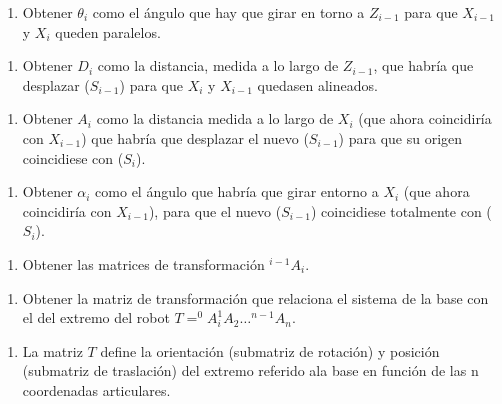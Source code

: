 \documentclass[twoside]{article}
\begin{document}
\begin{multicols}{2}
\begin{enumerate}
\def\labelenumi{\arabic{enumi}.}
\setcounter{enumi}{9}
\itemsep1pt\parskip0pt
\item
  Obtener $\theta_i$ como el ángulo que hay que girar en torno a $Z_{i-1}$ para que
  $X_{i-1}$ y $X_i$ queden paralelos.
\end{enumerate}

\begin{enumerate}
\def\labelenumi{\arabic{enumi}.}
\setcounter{enumi}{10}
\itemsep1pt\parskip0pt
\item
  Obtener $D_i$ como la distancia, medida a lo largo de $Z_{i-1}$, que habría
  que desplazar ($S_{i-1}$) para que $X_i$ y $X_{i-1}$ quedasen alineados.
\end{enumerate}

\begin{enumerate}
\def\labelenumi{\arabic{enumi}.}
\setcounter{enumi}{11}
\itemsep1pt\parskip0pt
\item
  Obtener $A_i$ como la distancia medida a lo largo de $X_i$ (que ahora
  coincidiría con $X_{i-1}$) que habría que desplazar el nuevo ($S_{i-1}$) para
  que su origen coincidiese con ($S_i$).
\end{enumerate}

\begin{enumerate}
\def\labelenumi{\arabic{enumi}.}
\setcounter{enumi}{12}
\itemsep1pt\parskip0pt
\item
  Obtener $\alpha_i$ como el ángulo que habría que girar entorno a $X_i$ (que ahora
  coincidiría con $X_{i-1}$), para que el nuevo ($S_{i-1}$) coincidiese totalmente
  con ($S_i$).
\end{enumerate}

\begin{enumerate}
\def\labelenumi{\arabic{enumi}.}
\setcounter{enumi}{13}
\itemsep1pt\parskip0pt
\item
  Obtener las matrices de transformación $^{i-1}A_i$.
\end{enumerate}

\begin{enumerate}
\def\labelenumi{\arabic{enumi}.}
\setcounter{enumi}{14}
\itemsep1pt\parskip0pt
\item
  Obtener la matriz de transformación que relaciona el sistema de la
  base con el del extremo del robot $T = ^0A_i  ^1A_2\ldots{} ^{n-1}A_n$.
\end{enumerate}

\begin{enumerate}
\def\labelenumi{\arabic{enumi}.}
\setcounter{enumi}{15}
\itemsep1pt\parskip0pt
\item
  La matriz $T$ define la orientación (submatriz de rotación) y posición
  (submatriz de traslación) del extremo referido ala base en función de
  las n coordenadas articulares.
\end{enumerate}


\end{multicols}
\end{document}
